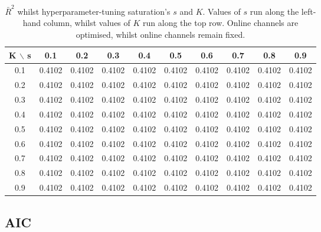 \documentclass[11pt, a4paper]{article}
\begin{document}
\begin{table}[h!]
    \centering
    \begin{tabular}{c|ccccccccc}
        \toprule
        \textbf{K $\backslash$ s} & \textbf{0.1} & \textbf{0.2} & \textbf{0.3} & \textbf{0.4} & \textbf{0.5} & \textbf{0.6} & \textbf{0.7} & \textbf{0.8} & \textbf{0.9} \\
        \midrule
        0.1 & 0.4102 & 0.4102 & 0.4102 & 0.4102 & 0.4102 & 0.4102 & 0.4102 & 0.4102 & 0.4102 \\
        0.2 & 0.4102 & 0.4102 & 0.4102 & 0.4102 & 0.4102 & 0.4102 & 0.4102 & 0.4102 & 0.4102 \\
        0.3 & 0.4102 & 0.4102 & 0.4102 & 0.4102 & 0.4102 & 0.4102 & 0.4102 & 0.4102 & 0.4102 \\
        0.4 & 0.4102 & 0.4102 & 0.4102 & 0.4102 & 0.4102 & 0.4102 & 0.4102 & 0.4102 & 0.4102 \\
        0.5 & 0.4102 & 0.4102 & 0.4102 & 0.4102 & 0.4102 & 0.4102 & 0.4102 & 0.4102 & 0.4102 \\
        0.6 & 0.4102 & 0.4102 & 0.4102 & 0.4102 & 0.4102 & 0.4102 & 0.4102 & 0.4102 & 0.4102 \\
        0.7 & 0.4102 & 0.4102 & 0.4102 & 0.4102 & 0.4102 & 0.4102 & 0.4102 & 0.4102 & 0.4102 \\
        0.8 & 0.4102 & 0.4102 & 0.4102 & 0.4102 & 0.4102 & 0.4102 & 0.4102 & 0.4102 & 0.4102 \\
        0.9 & 0.4102 & 0.4102 & 0.4102 & 0.4102 & 0.4102 & 0.4102 & 0.4102 & 0.4102 & 0.4102 \\
        \bottomrule
    \end{tabular}

    \caption{$\bar{R}^2$
 whilst hyperparameter-tuning saturation's $s$ and $K$. Values of $s$ run along the left-hand column, whilst values of $K$ run along the top row. Online channels are optimised, whilst online channels remain fixed.}
    \label{tab:s_k_r2_full}
\end{table}


\subsection{AIC}
\end{document}
